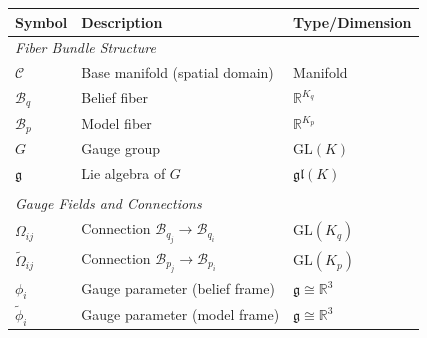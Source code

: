 \documentclass[twoside,11pt]{article}
\begin{document}
\begin{table}[h]
\centering
\renewcommand{\arraystretch}{1.15}
\setlength{\tabcolsep}{6pt}
\begin{tabularx}{\textwidth}{l>{\raggedright\arraybackslash}Xl}
\hline
\textbf{Symbol} & \textbf{Description} & \textbf{Type/Dimension} \\
\hline
\multicolumn{3}{l}{\textit{Fiber Bundle Structure}} \\
$\mathcal{C}$ & Base manifold (spatial domain) & Manifold \\
$\mathcal{B}_q$ & Belief fiber & $\mathbb{R}^{K_q}$ \\
$\mathcal{B}_p$ & Model fiber  & $\mathbb{R}^{K_p}$ \\
$G$ & Gauge group & $\mathrm{GL}(K)$ \\
$\mathfrak{g}$ & Lie algebra of $G$ & $\mathfrak{gl}(K)$ \\
\\
\multicolumn{3}{l}{\textit{Gauge Fields and Connections}} \\
$\Omega_{ij}$ & Connection $\mathcal{B}_{q_j} \to \mathcal{B}_{q_i}$ & $\mathrm{GL}(K_q)$ \\
$\tilde\Omega_{ij}$ & Connection $\mathcal{B}_{p_j} \to \mathcal{B}_{p_i}$ & $\mathrm{GL}(K_p)$ \\
$\phi_i$ & Gauge parameter (belief frame) & $\mathfrak{g}\!\cong\!\mathbb{R}^3$ \\
$\tilde{\phi}_i$ & Gauge parameter (model frame) & $\mathfrak{g}\!\cong\!\mathbb{R}^3$ \\


\end{tabularx}
\end{table}
\end{document}
